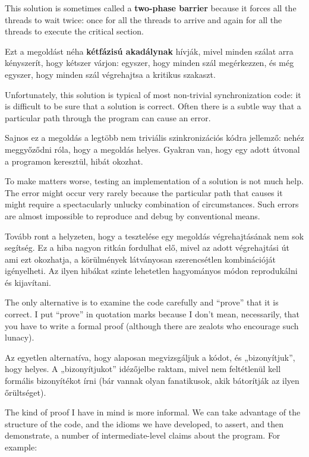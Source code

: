 \documentclass{book}
\begin{document}
This solution is sometimes called a {\bf two-phase barrier} because
it forces all the threads to wait twice: once for all the threads
to arrive and again for all the threads to execute the critical
section.

Ezt a megoldást néha {\bf kétfázisú akadálynak} hívják, mivel minden szálat
arra kényszerít, hogy kétszer várjon: egyszer, hogy minden szál megérkezzen,
és még egyszer, hogy minden szál végrehajtsa a kritikus szakaszt.

Unfortunately, this solution is typical of most non-trivial
synchronization code: it is difficult to be sure that a solution is
correct.  Often there is a subtle way that a particular path through
the program can cause an error.

Sajnos ez a megoldás a legtöbb nem triviális szinkronizációs kódra jellemző:
nehéz meggyőződni róla, hogy a megoldás helyes. Gyakran van, hogy egy adott
útvonal a programon keresztül, hibát okozhat.

To make matters worse, testing an implementation of a solution
is not much help.  The error might occur very rarely
because the particular path that causes it might
require a spectacularly unlucky combination of circumstances.
Such errors are almost
impossible to reproduce and debug by conventional means.

Tovább ront a helyzeten, hogy a tesztelése egy megoldás végrehajtásának
nem sok segítség.  Ez a hiba nagyon ritkán fordulhat elő, mivel az adott
végrehajtási út ami ezt okozhatja, a körülmények látványosan szerencsétlen kombinációját
igényelheti. Az ilyen hibákat szinte lehetetlen hagyományos módon
reprodukálni és kijavítani.

The only alternative is to examine the code carefully and
``prove'' that it is correct.  I put ``prove'' in quotation
marks because I don't mean, necessarily, that you have to write
a formal proof (although there are zealots who encourage
such lunacy).

Az egyetlen alternatíva, hogy alaposan megvizsgáljuk a kódot, és „bizonyítjuk”,
hogy helyes. A „bizonyítjukot” idézőjelbe raktam, mivel nem feltétlenül kell
formális bizonyítékot írni (bár vannak olyan fanatikusok, akik bátorítják
az ilyen őrültséget).

The kind of proof I have in mind is more informal.  We can take
advantage of the structure of the code, and the idioms we have
developed, to assert, and then demonstrate, a number of
intermediate-level claims about the program.  For example:
\end{document}
